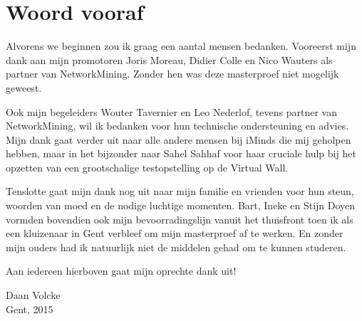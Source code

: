 \chapter*{Woord vooraf}

Alvorens we beginnen zou ik graag een aantal mensen bedanken.
Vooreerst mijn dank aan mijn promotoren Joris Moreau, Didier Colle en Nico Wauters als partner van NetworkMining.
Zonder hen was deze masterproef niet mogelijk geweest.

Ook mijn begeleiders Wouter Tavernier en Leo Nederlof, tevens partner van NetworkMining, wil ik bedanken voor hun technische ondersteuning en advies.
Mijn dank gaat verder uit naar alle andere mensen bij iMinds die mij geholpen hebben,
maar in het bijzonder naar Sahel Sahhaf voor haar cruciale hulp bij het opzetten van een grootschalige testopstelling op de Virtual Wall.

Tenslotte gaat mijn dank nog uit naar mijn familie en vrienden voor hun steun, woorden van moed en de nodige luchtige momenten.
Bart, Ineke en Stijn Doyen vormden bovendien ook mijn bevoorradingslijn vanuit het thuisfront toen ik als een kluizenaar in Gent verbleef om mijn masterproef af te werken.
En zonder mijn ouders had ik natuurlijk niet de middelen gehad om te kunnen studeren.


Aan iedereen hierboven gaat mijn oprechte dank uit!


\begin{flushright}
Daan Volcke \\
Gent, 2015
\end{flushright}

